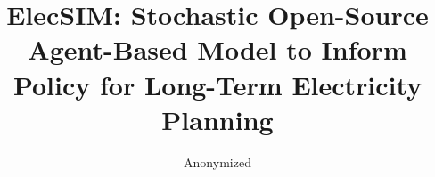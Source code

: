 \documentclass[sigconf]{acmart}
\begin{document}
%
\title[ElecSIM: Agent-Based Model to Inform Policy for Long-Term Electricity Planning]{ElecSIM: Stochastic Open-Source Agent-Based Model to Inform Policy for Long-Term Electricity Planning}

%

\author{Anonymized}

%
%
 
%



%
\begin{abstract}


\end{abstract}

%
%

%


%
\end{document}
